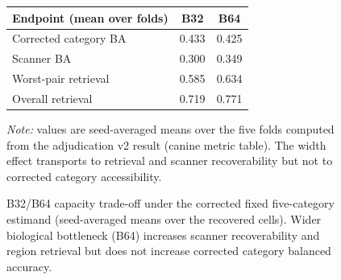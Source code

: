 \begin{figure}[!htbp]
\centering
\caption{B32/B64 capacity trade-off under the corrected fixed five-category
estimand (seed-averaged means over the recovered cells). Wider biological
bottleneck (B64) increases scanner recoverability and region retrieval but does
not increase corrected category balanced accuracy.}
\label{fig:tradeoff}
{\footnotesize
\setlength{\tabcolsep}{6pt}
\begin{tabular}{@{}lcc@{}}
\toprule
Endpoint (mean over folds) & B32 & B64 \\
\midrule
Corrected category BA & 0.433 & 0.425 \\
Scanner BA & 0.300 & 0.349 \\
Worst-pair retrieval & 0.585 & 0.634 \\
Overall retrieval & 0.719 & 0.771 \\
\bottomrule
\end{tabular}
}

\smallskip
\begin{minipage}{0.82\linewidth}
\footnotesize
\emph{Note:} values are seed-averaged means over the five folds computed from
the adjudication v2 result (canine metric table). The width effect transports
to retrieval and scanner recoverability but not to corrected category
accessibility.
\end{minipage}
\end{figure}
